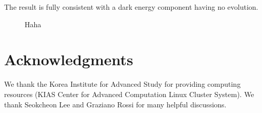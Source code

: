 \documentclass[useAMS,usenatbib]{mnras}
\begin{document}
The result is fully consistent with a dark energy component having no evolution.






\begin{figure*}
   \centering{
   }
   \caption{\label{fig_TpCF}
   Haha
   }
\end{figure*}




\section*{Acknowledgments}

We thank the Korea Institute for Advanced Study for providing computing resources (KIAS Center for Advanced Computation Linux Cluster System).
We thank Seokcheon Lee and Graziano Rossi for many helpful discussions.
\end{document}

